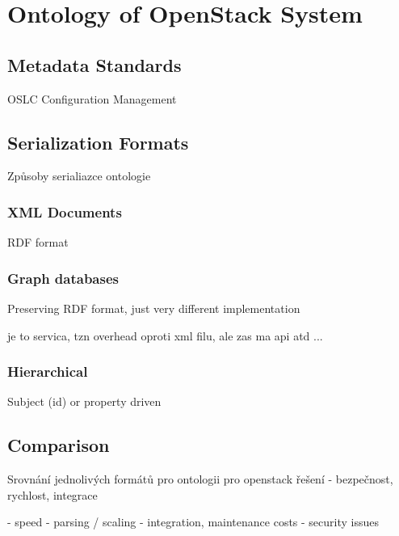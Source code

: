 
\section{Ontology of OpenStack System}

\subsection{Metadata Standards}

OSLC Configuration Management

\subsection{Serialization Formats}

Způsoby serialiazce ontologie

\subsubsection{XML Documents}

RDF format

\subsubsection{Graph databases}

Preserving RDF format, just very different implementation 

je to servica, tzn overhead oproti xml filu, ale zas ma api atd ...

\subsubsection{Hierarchical}

Subject (id) or property driven

\subsection{Comparison}

Srovnání jednolivých formátů pro ontologii pro openstack řešení - bezpečnost, rychlost, integrace

- speed - parsing / scaling
- integration, maintenance costs
- security issues

